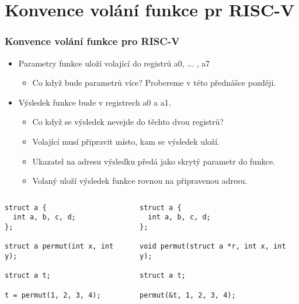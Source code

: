 \documentclass{beamer}
\begin{document}
\section{Konvence volání funkce pr RISC-V}

\begin{frame}[fragile]
\frametitle{Konvence volání funkce pro RISC-V}

\begin{itemize}
 \item Parametry funkce uloží volající do registrů a0, ... , a7
\begin{itemize}
 \item Co když bude parametrů více? Probereme v této přednášce později.
\end{itemize}
 \item Výsledek funkce bude v registrech a0 a a1.
\begin{itemize}
 \item Co když se výsledek nevejde do těchto dvou registrů?
 \item Volající musí připravit místo, kam se výsledek uloží.
 \item Ukazatel na adresu výsledku předá jako skrytý parametr do funkce.
 \item Volaný uloží výsledek funkce rovnou na připravenou adresu.
\end{itemize}
\end{itemize}

\begin{columns}
\begin{column}{0.45\textwidth}  
\begin{verbatim}
struct a {
  int a, b, c, d;
};

struct a permut(int x, int y);

struct a t;

t = permut(1, 2, 3, 4);
\end{verbatim}
\end{column}
\begin{column}{0.55\textwidth}  
\begin{verbatim}
struct a {
  int a, b, c, d;
};

void permut(struct a *r, int x, int y);

struct a t;

permut(&t, 1, 2, 3, 4);
\end{verbatim}
\end{column}
\end{columns}
\end{frame}
\end{document}
